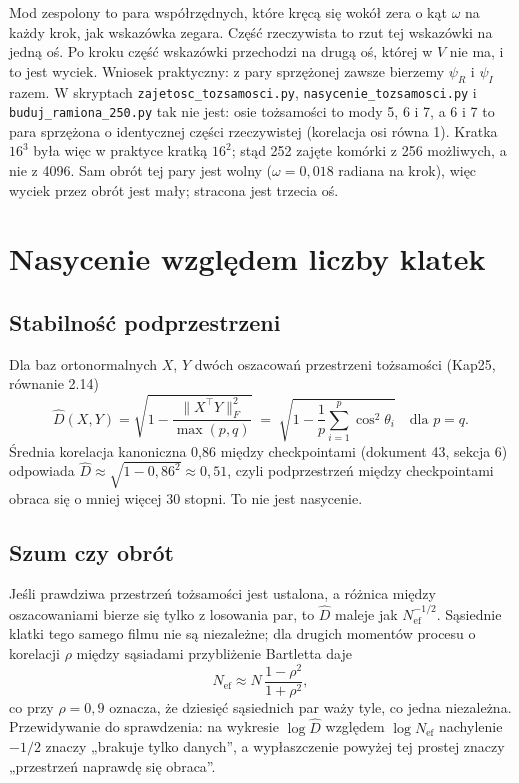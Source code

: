 \documentclass[11pt,a4paper]{article}
\theoremstyle{definition}
\theoremstyle{remark}
\newcommand{\T}{^{\top}}
\newcommand{\norm}[1]{\lVert #1\rVert}
\begin{document}
Mod zespolony to para współrzędnych, które kręcą się wokół zera o kąt $\omega$ na każdy krok, jak wskazówka
zegara. Część rzeczywista to rzut tej wskazówki na jedną oś. Po kroku część wskazówki przechodzi na drugą oś,
której w $V$ nie ma, i to jest wyciek. Wniosek praktyczny: z pary sprzężonej zawsze bierzemy
$\psi_R$ i $\psi_I$ razem. W skryptach \texttt{zajetosc\_tozsamosci.py}, \texttt{nasycenie\_tozsamosci.py}
i \texttt{buduj\_ramiona\_250.py} tak nie jest: osie tożsamości to mody 5, 6 i 7, a 6 i 7 to para sprzężona
o identycznej części rzeczywistej (korelacja osi równa 1). Kratka $16^3$ była więc w praktyce kratką
$16^2$; stąd 252 zajęte komórki z 256 możliwych, a nie z 4096. Sam obrót tej pary jest wolny
($\omega = 0{,}018$ radiana na krok), więc wyciek przez obrót jest mały; stracona jest trzecia oś.

\section{Nasycenie względem liczby klatek}

\subsection*{Stabilność podprzestrzeni}
Dla baz ortonormalnych $X$, $Y$ dwóch oszacowań przestrzeni tożsamości (Kap25, równanie 2.14)
\[
\widehat D(X,Y) = \sqrt{1 - \frac{\norm{X\T Y}_F^2}{\max(p,q)}}
\;=\; \sqrt{1 - \frac{1}{p}\sum_{i=1}^{p}\cos^2\theta_i}\quad\text{dla } p=q .
\]
Średnia korelacja kanoniczna 0,86 między checkpointami (dokument 43, sekcja 6) odpowiada
$\widehat D\approx\sqrt{1-0{,}86^2}\approx 0{,}51$, czyli podprzestrzeń między checkpointami obraca się
o mniej więcej 30 stopni. To nie jest nasycenie.

\subsection*{Szum czy obrót}
Jeśli prawdziwa przestrzeń tożsamości jest ustalona, a różnica między oszacowaniami bierze się tylko
z losowania par, to $\widehat D$ maleje jak $N_{\mathrm{ef}}^{-1/2}$. Sąsiednie klatki tego samego filmu nie
są niezależne; dla drugich momentów procesu o korelacji $\rho$ między sąsiadami przybliżenie Bartletta daje
\[
N_{\mathrm{ef}} \approx N\,\frac{1-\rho^2}{1+\rho^2},
\]
co przy $\rho = 0{,}9$ oznacza, że dziesięć sąsiednich par waży tyle, co jedna niezależna. Przewidywanie
do sprawdzenia: na wykresie $\log\widehat D$ względem $\log N_{\mathrm{ef}}$ nachylenie $-1/2$ znaczy
„brakuje tylko danych”, a wypłaszczenie powyżej tej prostej znaczy „przestrzeń naprawdę się obraca”.
\end{document}
